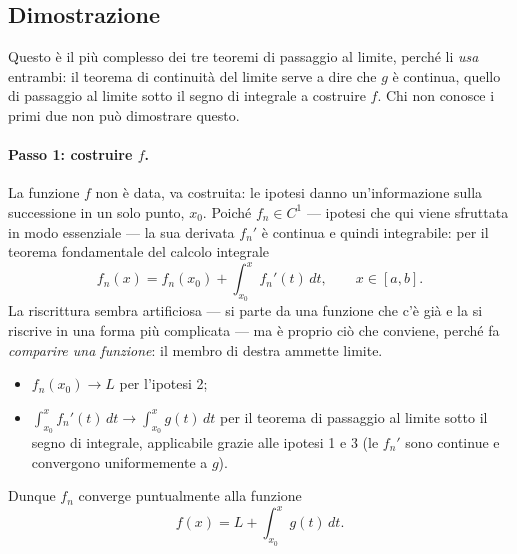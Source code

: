 
\subsection{Dimostrazione}
Questo è il più complesso dei tre teoremi di passaggio al limite, perché li \emph{usa}
entrambi: il teorema di continuità del limite serve a dire che $g$ è continua, quello di
passaggio al limite sotto il segno di integrale a costruire $f$. Chi non conosce i primi
due non può dimostrare questo.

\paragraph{Passo 1: costruire $f$.} La funzione $f$ non è data, va costruita: le ipotesi
danno un'informazione sulla successione in un solo punto, $x_0$. Poiché $f_n\in C^1$
— ipotesi che qui viene sfruttata in modo essenziale — la sua derivata $f_n'$ è continua
e quindi integrabile: per il teorema fondamentale del calcolo integrale
\begin{equation}
f_n(x)=f_n(x_0)+\int_{x_0}^{x} f_n'(t)\,dt,\qquad x\in[a,b].
\end{equation}
La riscrittura sembra artificiosa — si parte da una funzione che c'è già e la si riscrive
in una forma più complicata — ma è proprio ciò che conviene, perché fa \emph{comparire una
funzione}: il membro di destra ammette limite.
\begin{itemize}
  \item $f_n(x_0)\to L$ per l'ipotesi 2;
  \item $\displaystyle\int_{x_0}^{x} f_n'(t)\,dt\to\int_{x_0}^{x} g(t)\,dt$ per il
  teorema di passaggio al limite sotto il segno di integrale, applicabile grazie alle
  ipotesi 1 e 3 (le $f_n'$ sono continue e convergono uniformemente a $g$).
\end{itemize}
Dunque $f_n$ converge puntualmente alla funzione
\begin{equation}
f(x)=L+\int_{x_0}^{x} g(t)\,dt .
\end{equation}

